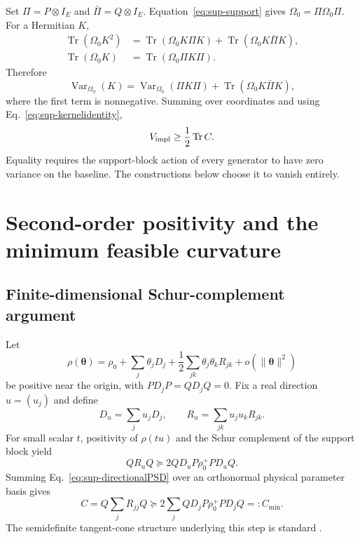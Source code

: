 \documentclass[aps,pra,preprint,nofootinbib]{revtex4-2}
\newcommand{\Tr}{\operatorname{Tr}}
\newcommand{\Var}{\operatorname{Var}}
\newcommand{\rhozero}{\rho_0}
\newcommand{\Omegazero}{\Omega_0}
\newcommand{\Cmin}{C_{\min}}
\newcommand{\Cker}{C}
\newcommand{\Vimpl}{V_{\rm impl}}
\begin{document}
Set $\Pi=P\otimes I_E$ and $\bar\Pi=Q\otimes I_E$. Equation~\eqref{eq:sup-support} gives $\Omegazero=\Pi\Omegazero\Pi$. For a Hermitian $K$,
\begin{align}
 \Tr(\Omegazero K^2)
 &=\Tr(\Omegazero K\Pi K)
  +\Tr(\Omegazero K\bar\Pi K),\\
 \Tr(\Omegazero K)&=\Tr(\Omegazero\Pi K\Pi).
\end{align}
Therefore
\begin{equation}
 \Var_{\Omegazero}(K)
 =\Var_{\Omegazero}(\Pi K\Pi)
 +\Tr(\Omegazero K\bar\Pi K),
 \label{eq:sup-vardecomp}
\end{equation}
where the first term is nonnegative. Summing over coordinates and using Eq.~\eqref{eq:sup-kernelidentity},
\begin{equation}
 \Vimpl\ge\frac12\Tr\Cker.
 \label{eq:sup-lower}
\end{equation}
Equality requires the support-block action of every generator to have zero variance on the baseline. The constructions below choose it to vanish entirely.

\section{Second-order positivity and the minimum feasible curvature}

\subsection{Finite-dimensional Schur-complement argument}

Let
\begin{equation}
 \rho(\bm\theta)=\rhozero+\sum_j\theta_jD_j+\frac12\sum_{jk}\theta_j\theta_kR_{jk}+o(\|\bm\theta\|^2)
\end{equation}
be positive near the origin, with $PD_jP=QD_jQ=0$. Fix a real direction $u=(u_j)$ and define
\begin{equation}
 D_u=\sum_j u_jD_j,\qquad R_u=\sum_{jk}u_ju_kR_{jk}.
\end{equation}
For small scalar $t$, positivity of $\rho(tu)$ and the Schur complement of the support block yield
\begin{equation}
 QR_uQ\succeq2QD_uP\rhozero^+PD_uQ.
 \label{eq:sup-directionalPSD}
\end{equation}
Summing Eq.~\eqref{eq:sup-directionalPSD} over an orthonormal physical parameter basis gives
\begin{equation}
 \Cker=Q\sum_jR_{jj}Q
 \succeq2\sum_jQD_jP\rhozero^+PD_jQ=:\Cmin.
 \label{eq:sup-Cmin}
\end{equation}
The semidefinite tangent-cone structure underlying this step is standard \cite{Shapiro1997,BonnansCominettiShapiro1999}.
\end{document}
